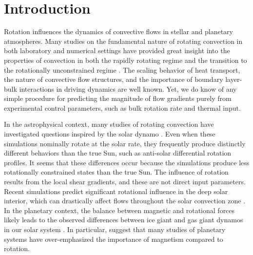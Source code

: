 \documentclass[twocolumn, amsmath, amsfonts, amssymb]{aastex62}
\begin{document}
\section{Introduction}
\label{sec:intro}
Rotation influences the dynamics of convective flows in
stellar and planetary atmospheres.
Many studies on the fundamental nature of
rotating convection in both laboratory and numerical settings
have provided great insight into the properties of convection 
in both the rapidly rotating regime 
\citep{julien&all2012, stellmach&all2014, gastine&all2016}
and the transition to the rotationally unconstrained regime \citep{king&all2009, zhong&all2009, 
cheng&all2015}. 
The scaling behavior of heat transport, the nature of convective flow
structures, and the importance of boundary layer-bulk interactions in driving dynamics are well known.
Yet, we do know of any simple procedure for predicting the magnitude of flow gradients 
purely from experimental control parameters, such as bulk rotation rate and thermal input.

In the astrophysical context,
many studies of rotating convection have investigated questions inspired by the solar dynamo
\citep{glatzmaier&gilman1982, busse2002, brown&all2008,
brown&all2010, brown&all2011, augustson&all2012, guerrero&all2013, kapyla&all2014}.
Even when these simulations nominally rotate at the solar rate,
they frequently produce distinctly different behaviors than the true Sun,
such as anti-solar differential rotation profiles.
It seems that these differences occur because the simulations produce less rotationally 
constrained states than the true Sun. The influence of rotation results from the local 
shear gradients, and these are not direct input parameters.
Recent simulations predict significant rotational influence in the deep solar interior, 
which can drastically affect flows throughout the solar convection zone 
\citep{featherstone&hindman2016, greer&all2016}. 
In the planetary context, the balance between magnetic
and rotational forces likely leads to the observed differences between ice
giant and gas giant dynamos in our solar system \citep{soderlund&all2015}.
In particular, \cite{aurnou&king2017} suggest that many studies of planetary systems
have over-emphasized the importance of magnetism compared to rotation.
\end{document}
